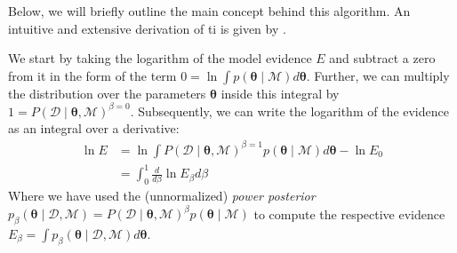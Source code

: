 \documentclass[twocolumn]{aastex631}
\begin{document}
Below, we will briefly outline the main concept behind this algorithm. An intuitive and extensive derivation of \gls{ti} is given by \cite{aponte_introduction_2022}.

We start by taking the logarithm of the model evidence $E$ and subtract a zero from it in the form of the term $0 = \ln \int p(\boldsymbol{\theta} \mid \mathcal{M}) d\boldsymbol{\theta}$. Further, we can multiply the distribution over the parameters $\boldsymbol{\theta}$ inside this integral by $1 = P \left( \boldsymbol{\mathcal{D}} \mid \boldsymbol{\theta}, \mathcal{M} \right)^{\beta=0}$. Subsequently, we can write the logarithm of the evidence as an integral over a derivative:
%
\begin{equation} \label{eq:ti}
    \begin{aligned}
        \ln E &= \ln \int P \left( \boldsymbol{\mathcal{D}} \mid \boldsymbol{\theta}, \mathcal{M} \right)^{\beta=1} p \left( \boldsymbol{\theta} \mid \mathcal{M} \right) d\boldsymbol{\theta} - \ln E_0 \\
        &= \int_0^1 \frac{d}{d\beta} \ln E_\beta d\beta
    \end{aligned}
\end{equation}
%
Where we have used the (unnormalized) \emph{power posterior} $p_\beta \left( \boldsymbol{\theta} \mid \boldsymbol{\mathcal{D}}, \mathcal{M} \right) = P \left( \boldsymbol{\mathcal{D}} \mid \boldsymbol{\theta}, \mathcal{M} \right)^\beta p \left( \boldsymbol{\theta} \mid \mathcal{M} \right)$ to compute the respective evidence $E_\beta = \int p_\beta \left( \boldsymbol{\theta} \mid \boldsymbol{\mathcal{D}}, \mathcal{M} \right) d\boldsymbol{\theta}$.
\end{document}
